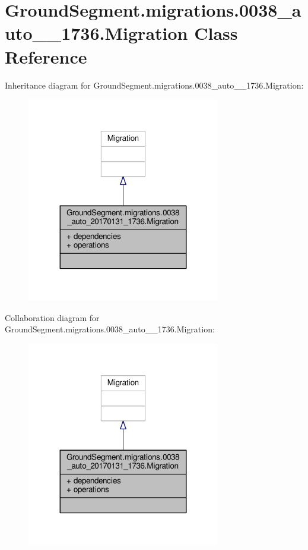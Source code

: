 \hypertarget{class_ground_segment_1_1migrations_1_10038__auto__20170131__1736_1_1_migration}{}\section{Ground\+Segment.\+migrations.0038\+\_\+auto\+\_\+\_\+1736.Migration Class Reference}
\label{class_ground_segment_1_1migrations_1_10038__auto__20170131__1736_1_1_migration}


Inheritance diagram for Ground\+Segment.\+migrations.0038\+\_\+auto\+\_\+\_\+1736.Migration\+:\nopagebreak
\begin{figure}[H]
\begin{center}
\leavevmode
\includegraphics[width=239pt]{class_ground_segment_1_1migrations_1_10038__auto__20170131__1736_1_1_migration__inherit__graph}
\end{center}
\end{figure}


Collaboration diagram for Ground\+Segment.\+migrations.0038\+\_\+auto\+\_\+\_\+1736.Migration\+:\nopagebreak
\begin{figure}[H]
\begin{center}
\leavevmode
\includegraphics[width=239pt]{class_ground_segment_1_1migrations_1_10038__auto__20170131__1736_1_1_migration__coll__graph}
\end{center}
\end{figure}
